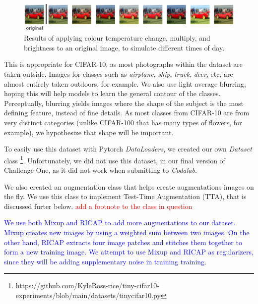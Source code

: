\documentclass[a4paper,11pt]{article}
\begin{document}
\begin{figure}[h]
    \centering
    \includegraphics[width=\textwidth]{time_of_day_augment.png}
    \caption{Results of applying colour temperature change, multiply, and brightness to an original image, to simulate different times of day.}
    \label{fig:time_of_day_augmentation}
\end{figure}

This is appropriate for CIFAR-10, as most photographs within the dataset are taken outside. Images for classes such as \textit{airplane}, \textit{ship}, \textit{truck}, \textit{deer}, etc, are almost entirely taken outdoors, for example. We also use light average blurring, hoping this will help models to learn the general contour of the classes. Perceptually, blurring yields images where the shape of the subject is the most defining feature, instead of fine details. As most classes from CIFAR-10 are from very distinct categories (unlike CIFAR-100 that has many types of flowers, for example), we hypothesize that shape will be important.

To easily use this dataset with Pytorch \textit{DataLoaders}, we created our own \textit{Dataset} class \footnote{https://github.com/KyleRoss-rice/tiny-cifar10-experiments/blob/main/datasets/tinycifar10.py}. Unfortunately, we did not use this dataset, in our final version of Challenge One, as it did not work when submitting to \textit{Codalab}. 

We also created an augmentation class that helps create augmentations images on the fly. We use this class to implement Test-Time Augmentation (TTA), that is discussed furter below. \textcolor{red}{add a footnote to the class in question}

\textcolor{blue}{We use both Mixup \cite{zhang2017mixup} and RICAP \cite{takahashi2018ricap} to add more augmentations to our dataset. Mixup creates new images by using a weighted sum between two images. On the other hand, RICAP extracts four image patches and stitches them together to form a new training image. We attempt to use Mixup and RICAP as regularizers, since they will be adding supplementary noise in training training.}
\end{document}
